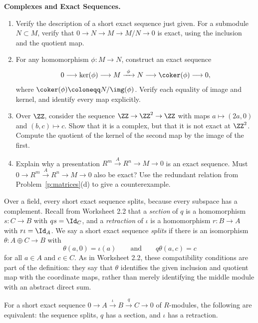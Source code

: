 \documentclass[12pt,reqno]{amsart}
\begin{document}
\hrulefill

\begin{problems}
\item\label{p:exactness} \textbf{Complexes and Exact Sequences.}
\begin{enumerate}
\item Verify the description of a short exact sequence just given. For a submodule $N\subset M$, verify that $0\to N\to M\to M/N\to0$ is exact, using the inclusion and the quotient map.
\item For any homomorphism $\phi:M\to N$, construct an exact sequence
\[
0\longrightarrow\ker(\phi)\longrightarrow M\xrightarrow{\ \phi\ }N\longrightarrow\coker(\phi)\longrightarrow0,
\]
where $\coker(\phi)\coloneqq N/\img(\phi)$. Verify each equality of image and kernel, and identify every map explicitly.
\item Over $\ZZ$, consider the sequence $\ZZ\to\ZZ^2\to\ZZ$ with maps $a\mapsto(2a,0)$ and $(b,c)\mapsto c$. Show that it is a complex, but that it is not exact at $\ZZ^2$. Compute the quotient of the kernel of the second map by the image of the first.
\item Explain why a presentation $R^m\xrightarrow{A}R^n\to M\to0$ is an exact sequence. Must $0\to R^m\xrightarrow{A}R^n\to M\to0$ also be exact? Use the redundant relation from Problem~\ref{p:matrices}(d) to give a counterexample.
\end{enumerate}
\end{problems}

\hrulefill

Over a field, every short exact sequence splits, because every subspace has a complement. Recall from Worksheet 2.2 that a \emph{section} of $q$ is a homomorphism $s:C\to B$ with $qs=\Id_C$, and a \emph{retraction} of $\iota$ is a homomorphism $r:B\to A$ with $r\iota=\Id_A$. We say a short exact sequence \emph{splits} if there is an isomorphism $\theta:A\oplus C\to B$ with
\[
\theta(a,0)=\iota(a)\qquad\text{and}\qquad q\theta(a,c)=c
\]
for all $a\in A$ and $c\in C$. As in Worksheet 2.2, these compatibility conditions are part of the definition: they say that $\theta$ identifies the given inclusion and quotient map with the coordinate maps, rather than merely identifying the middle module with an abstract direct sum.

\begin{theorem}
For a short exact sequence $0\to A\xrightarrow{\iota}B\xrightarrow{q}C\to0$ of $R$-modules, the following are equivalent: the sequence splits, $q$ has a section, and $\iota$ has a retraction.
\end{theorem}
\end{document}
